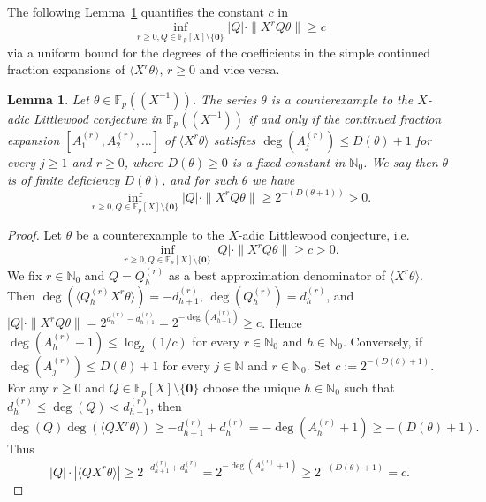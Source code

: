 \documentclass{article}
\newcommand{\NN}{\mathbb N}
\newcommand{\FF}{\mathbb{F}}
\renewcommand{\(}{\left (}
\renewcommand{\)}{\right )}
\newtheorem{theorem}{Theorem}[section]
\newtheorem{lemma}[theorem]{Lemma}
\theoremstyle{definition}
\numberwithin{equation}{section}
\begin{document}
 The following Lemma~\ref{lem:Counterexample} quantifies the constant $c$ in $$\inf_{r\geq 0,Q\in\FF_p[X]\setminus\{\boldsymbol{0}\}} |Q| \cdot\|X^rQ\theta\|\geq c$$ via a uniform bound for the degrees of the coefficients in the simple continued fraction expansions of $\langle X^r\theta\rangle,\,r\geq 0$ and vice versa. 
\begin{lemma}\label{lem:Counterexample}
Let $\theta\in\FF_p((X^{-1}))$. The series $\theta$ is a counterexample to the $X$-adic Littlewood conjecture in $\FF_p((X^{-1}))$ if and only if the continued fraction expansion $[A^{(r)}_1,A^{(r)}_2,\ldots]$ of $\langle X^r\theta\rangle$ satisfies $\deg(A^{(r)}_j)\leq D(\theta)+1$ for every $j\geq 1$ and $r\geq 0$, where $D(\theta)\geq 0$ is a fixed constant in $\NN_0$. We say then $\theta$ is of finite deficiency $D(\theta)$, and for such $\theta$ we have $$\inf_{r\geq 0,Q\in\FF_p[X]\setminus\{\boldsymbol{0}\}} |Q| \cdot\|X^rQ\theta\|\geq 2^{-(D(\theta+1))}>0.$$ 
\end{lemma}
\begin{proof}
	Let $\theta$ be a counterexample to the $X$-adic Littlewood conjecture, i.e. $$\inf_{r\geq 0,Q\in\FF_p[X]\setminus\{\boldsymbol{0}\}} |Q| \cdot\|X^rQ\theta\|\geq c>0.$$
	We fix $r\in\NN_0$ and $Q=Q_h^{(r)}$ as a best approximation denominator of $\langle X^r \theta\rangle$. Then $\deg(\langle Q_h^{(r)}X^r \theta\rangle)=-d^{(r)}_{h+1}$, $\deg(Q_h^{(r)})=d^{(r)}_{h}$, and 
	$|Q| \cdot\|X^rQ\theta\|=2^{d^{(r)}_{h}-d^{(r)}_{h+1}}=2^{-\deg(A^{(r)}_{h+1})}\geq c$. Hence $\deg(A^{(r)}_{h}+1)\leq \log_2(1/c)$ for every $r\in\NN_0$ and $h\in\NN_0$. Conversely, if $\deg(A^{(r)}_j)\leq D(\theta)+1$ for every $j\in\NN$ and $r\in\NN_0$. Set $c:=2^{-(D(\theta)+1)}$. For any $r\geq 0$ and $Q\in\FF_p[X]\setminus\{\boldsymbol{0}\}$ choose the unique $h\in\NN_0$ such that $d^{(r)}_h\leq \deg(Q)<d^{(r)}_{h+1}$, then 
	$$\deg(Q)\deg(\langle QX^r \theta\rangle)\geq -d^{(r)}_{h+1}+d^{(r)}_h=-\deg(A^{(r)}_{h}+1)\geq -(D(\theta)+1).$$
	Thus 
	$$|Q|\cdot |\langle QX^r \theta\rangle|\geq 2^{-d^{(r)}_{h+1}+d^{(r)}_h}=2^{-\deg(A^{(r)}_{h}+1)}\geq 2^{-(D(\theta)+1)}=c.$$	
\end{proof}


\end{document}

